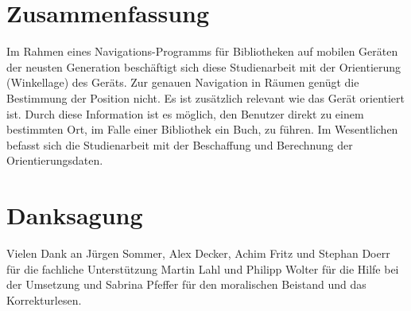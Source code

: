 \documentclass[twoside,12pt,a4paper]{report}
\begin{document}


\section*{Zusammenfassung}

Im Rahmen eines Navigations-Programms für Bibliotheken auf mobilen Geräten der neusten Generation beschäftigt sich diese Studienarbeit mit der Orientierung (Winkellage) des Geräts. Zur genauen Navigation in Räumen genügt die Bestimmung der Position nicht. Es ist zusätzlich relevant wie das Gerät orientiert ist. Durch diese Information ist es möglich, den Benutzer direkt zu einem bestimmten Ort, im Falle einer Bibliothek ein Buch, zu führen. Im Wesentlichen befasst sich die Studienarbeit mit der Beschaffung und Berechnung der Orientierungsdaten.

\newpage
\section*{Danksagung}

Vielen Dank an Jürgen Sommer, Alex Decker, Achim Fritz und Stephan Doerr für die fachliche Unterstützung Martin Lahl und Philipp Wolter für die Hilfe bei der Umsetzung und Sabrina Pfeffer für den moralischen Beistand und das Korrekturlesen.

\cleardoublepage


\renewcommand{\baselinestretch}{1.3}
\small\normalsize

\tableofcontents

\renewcommand{\baselinestretch}{1}
\small\normalsize

\cleardoublepage


\renewcommand{\baselinestretch}{1.3}
\small\normalsize

\listoffigures

\renewcommand{\baselinestretch}{1}
\small\normalsize
\end{document}
